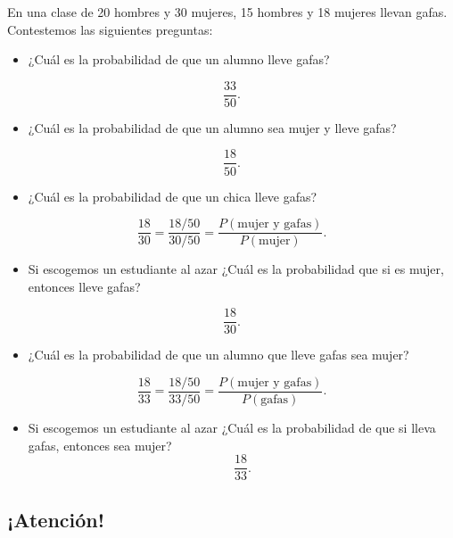\documentclass[]{book}
\providecommand{\tightlist}{%
  \setlength{\itemsep}{0pt}\setlength{\parskip}{0pt}}
\begin{document}
En una clase de 20 hombres y 30 mujeres, 15 hombres y 18 mujeres llevan gafas. Contestemos las siguientes preguntas:

\begin{itemize}
\tightlist
\item
  ¿Cuál es la probabilidad de que un alumno lleve gafas?
\end{itemize}

\[
\frac{33}{50}.
\]

\begin{itemize}
\tightlist
\item
  ¿Cuál es la probabilidad de que un alumno sea mujer y lleve gafas?
\end{itemize}

\[
\frac{18}{50}.
\]

\begin{itemize}
\tightlist
\item
  ¿Cuál es la probabilidad de que un chica lleve gafas?
\end{itemize}

\[
\frac{18}{30}=\frac{18/50}{30/50}=\frac{P(\mbox{mujer  y gafas})}{P(\mbox{mujer})}.
\]

\begin{itemize}
\tightlist
\item
  Si escogemos un estudiante al azar ¿Cuál es la probabilidad que si es mujer, entonces lleve gafas?
\end{itemize}

\[
\frac{18}{30}.
\]

\begin{itemize}
\tightlist
\item
  ¿Cuál es la probabilidad de que un alumno que lleve gafas sea mujer?
\end{itemize}

\[
\frac{18}{33}=\frac{18/50}{33/50}=\frac{P(\mbox{mujer y gafas})}{P(\mbox{gafas})}.
\]

\begin{itemize}
\tightlist
\item
  Si escogemos un estudiante al azar ¿Cuál es la probabilidad de que si lleva gafas, entonces sea mujer?
  \[
  \frac{18}{33}.
  \]
\end{itemize}

\hypertarget{atenciuxf3n}{%
\subsection{¡Atención!}\label{atenciuxf3n}}
\end{document}
